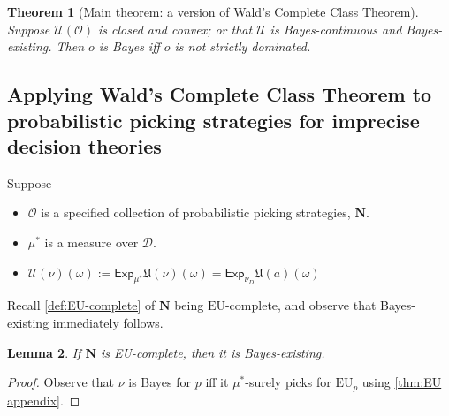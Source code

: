 \documentclass[a4paper]{article}
\newtheorem{theorem}{Theorem}
\newtheorem{lemma}[theorem]{Lemma}
\newcommand\D{\mathcal{D}}
\newcommand\N{\mathbf{N}}
\newcommand\Exp{\mathsf{Exp}}
\newcommand\EU{\mathrm{EU}}
\renewcommand\O{\mathcal{O}}
\newcommand\U{\mathfrak{U}} %
\newcommand\Uwald{\mathcal{U}} %
\newcommand{\todoinfo}[2][]{\todo[backgroundcolor=orange!80,bordercolor=black,linecolor=gray!80, #1,inline,caption={}]{#2}}
\newenvironment{CCM rewritten}
{\begingroup\color{blue}} %
{\endgroup}              %
\begin{document}
\begin{theorem}[Main theorem: a version of Wald's Complete Class Theorem]
	Suppose $\Uwald(\O)$ is closed and convex; or that $\Uwald$ is Bayes-continuous and Bayes-existing. Then $o$ is Bayes iff $o$ is not strictly dominated.
\end{theorem}
\subsection{Applying Wald's Complete Class Theorem to probabilistic picking strategies for imprecise decision theories}

Suppose
\begin{itemize}
\item $\O$ is a specified collection of probabilistic picking strategies, $\N$.
\item $\mu^*$ is a measure over $\D$.
\item $\Uwald(\nu)(\omega):=\Exp_{\mu^*}\U(\nu)(\omega)=\Exp_{\nu_{D}} \U(a)(\omega)$
\end{itemize}

Recall \cref{def:EU-complete} of $\N$ being $\EU$-complete, and observe that Bayes-existing immediately follows. 
\begin{lemma}\label{thm:cct-appln:existing}
	If $\N$ is EU-complete, then it is Bayes-existing. 
\end{lemma}
\begin{proof}
	Observe that $\nu$ is Bayes for $p$ iff it ${\mu^*}$-surely picks for $\EU_p$ using \cref{thm:EU appendix}. %
\end{proof}
\end{document}

